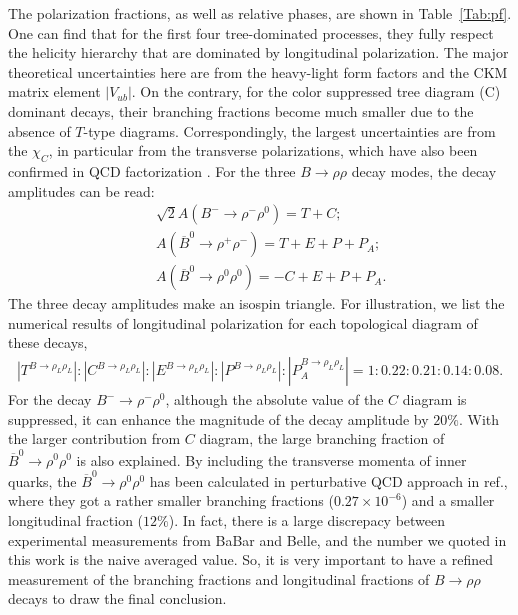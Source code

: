 \documentclass[11pt]{article}
\begin{document}
  The polarization fractions, as well as relative phases, are shown in Table~\ref{Tab:pf}.
One can find that for the first four tree-dominated processes, they fully respect the helicity hierarchy that are dominated by longitudinal polarization. The major theoretical uncertainties here are from the heavy-light form factors and the CKM matrix element $|V_{ub}|$. On the contrary, for the color suppressed tree diagram (C) dominant decays, their branching fractions become much smaller due to the absence of $T$-type diagrams. Correspondingly, the largest uncertainties are from the $\chi_C$, in particular from the transverse polarizations, which have also been confirmed in QCD factorization \cite{Beneke:2006hg, Cheng:2008gxa}. For the three $B\to \rho\rho$ decay modes, the decay amplitudes can be read:
\begin{eqnarray}
&& \sqrt{2} A(B^-\to\rho^- \rho^0) =T+C;\\
&&A(\overline B^0\to\rho^+ \rho^-)=T+E+P+P_A;\\
&&A(\overline B^0\to\rho^0 \rho^0)=-C+E+P+P_A.
\end{eqnarray}
The three decay amplitudes make an isospin triangle. For illustration, we list the numerical  results of longitudinal polarization for each topological diagram of these decays,
\begin{eqnarray}
|T^{B\to\rho_L\rho_L}|:|C^{B\to\rho_L\rho_L}|:|E^{B\to\rho_L\rho_L}|:|P^{B\to\rho_L\rho_L}|:|P_A^{B\to\rho_L\rho_L}|=1:0.22:0.21:0.14:0.08.
\end{eqnarray}
For the decay  $B^-\to\rho^- \rho^0$, although the absolute value of the $C$ diagram is suppressed,  it can enhance the  magnitude of the decay amplitude by $20\%$.   With the larger contribution from $C$ diagram, the large branching fraction of $\overline B^0\to\rho^0 \rho^0$ is also explained. By including the transverse momenta of inner quarks, the $\overline B^0\to\rho^0 \rho^0$ has been calculated in perturbative QCD approach in ref.\cite{Zou:2015iwa}, where they got a rather smaller branching fractions ($0.27\times 10^{-6}$) and a smaller longitudinal fraction ($12\%$). In fact, there is a large discrepacy between experimental measurements from BaBar and Belle, and the number we quoted in this work is the naive averaged value. So, it is very important to have a refined measurement of the branching fractions and  longitudinal fractions of $B\to\rho\rho$ decays to draw the final conclusion.
\end{document}
